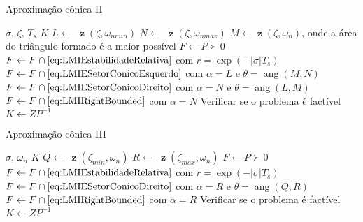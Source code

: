 \documentclass[aspectratio=169,11pt,t,xcolor={usenames,dvipsnames,x11names}]{beamer}
\DeclareMathOperator{\angulo}{ang}
\DeclareMathOperator{\z}{\textbf{z}}
\begin{document}
\begin{frame}[c]{Aproximação cônica II}
	  \begin{algorithmic}[1]
	    \Require $\sigma$, $\zeta$, $T_s$
	    \Ensure $K$
	    \State $L \gets $ $\z(\zeta,\omega_{nmin})$
	    \State $N \gets $ $\z\left(\zeta,\omega_{nmax}\right)$
	    \State $M \gets \z(\zeta,\omega_n)$, onde a área do triângulo formado é a maior possível
	    \State $F \gets P \succ 0$
	    \State $F \gets F \cap \eqref{eq:LMIEstabilidadeRelativa}$ com $r = \exp{\left(-|\sigma|T_s\right)}$ 
	    \State $F \gets F \cap \eqref{eq:LMIESetorConicoEsquerdo}$ com $\alpha = L$ e $\theta = \angulo(M,N)$ 
	    \State $F \gets F \cap \eqref{eq:LMIESetorConicoDireito}$ com $\alpha = N$ e $\theta = \angulo(L,M)$ 
	    \State $F \gets F \cap \eqref{eq:LMIRightBounded}$ com $\alpha = N$  
	    \State Verificar se o problema é factível
	    \State $K \gets ZP^{-1}$
	  \end{algorithmic}
\end{frame}

\begin{frame}[c]{Aproximação cônica III}
	  \begin{algorithmic}[1]
	    \Require $\sigma$, $\omega_n$
	    \Ensure $K$
	    \State $Q \gets $ $\z(\zeta_{min},\omega_n)$
	    \State $R \gets $ $\z(\zeta_{max},\omega_n)$
	    \State $F \gets P \succ 0$
	    \State $F \gets F \cap \eqref{eq:LMIEstabilidadeRelativa}$ com $r = \exp{\left(-|\sigma|T_s\right)}$ 
	    \State $F \gets F \cap \eqref{eq:LMIESetorConicoDireito}$ com $\alpha = R$ e $\theta = \angulo(Q,R)$ 
	    \State $F \gets F \cap \eqref{eq:LMIRightBounded}$ com $\alpha = R$ 
	    \State Verificar se o problema é factível
	    \State $K \gets ZP^{-1}$
	  \end{algorithmic}
\end{frame}
\end{document}
